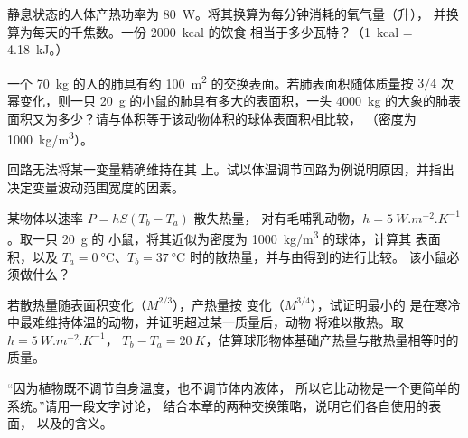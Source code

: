 \begin{exercise}[$\star\star$]\label{exo:b1:organism-environment:7}
静息状态的人体产热功率为 \qty{80}{W}。将其换算为每分钟消耗的氧气量（升），
并换算为每天的千焦数。一份 \qty{2000}{kcal} 的饮食
相当于多少瓦特？（\qty{1}{kcal} = \qty{4.18}{kJ}。）
\end{exercise}

\begin{exercise}[$\star\star$]\label{exo:b1:organism-environment:8}
一个 \qty{70}{kg} 的人的肺具有约
\qty{100}{m^2} 的交换表面。若肺表面积随体质量按
$3/4$ 次幂变化，则一只 \qty{20}{g} 的小鼠的肺具有多大的表面积，一头
\qty{4000}{kg} 的大象的肺表面积又为多少？请与体积等于该动物体积的球体表面积相比较，
（密度为 \qty{1000}{kg/m^3}）。
\end{exercise}

\begin{exercise}[$\star\star$]\label{exo:b1:organism-environment:9}
回路无法将某一变量精确维持在其
上。试以体温调节回路为例说明原因，并指出
决定变量波动范围宽度的因素。
\end{exercise}

\begin{exercise}[$\star\star\star$]\label{exo:b1:organism-environment:10}
某物体以速率 $P = hS(T_b - T_a)$ 散失热量，
对有毛哺乳动物，$h = \qty{5}{W.m^{-2}.K^{-1}}$。取一只 \qty{20}{g} 的
小鼠，将其近似为密度为 \qty{1000}{kg/m^3} 的球体，计算其
表面积，以及 $T_a = \qty{0}{\celsius}$、$T_b =
\qty{37}{\celsius}$ 时的散热量，并与由得到的进行比较。
该小鼠必须做什么？
\end{exercise}

\begin{exercise}[$\star\star\star$]\label{exo:b1:organism-environment:11}
若散热量随表面积变化（$M^{2/3}$），产热量按
变化（$M^{3/4}$），试证明最小的
是在寒冷中最难维持体温的动物，并证明超过某一质量后，动物
将难以散热。取 $h = \qty{5}{W.m^{-2}.K^{-1}}$，
$T_b - T_a = \qty{20}{K}$，估算球形物体基础产热量与散热量相等时的
质量。
\end{exercise}

\begin{exercise}[$\star\star\star$]\label{exo:b1:organism-environment:12}
“因为植物既不调节自身温度，也不调节体内液体，
所以它比动物是一个更简单的系统。”请用一段文字讨论，
结合本章的两种交换策略，说明它们各自使用的表面，
以及的含义。
\end{exercise}

